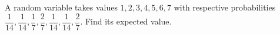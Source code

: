 A random variable takes values $1,2,3,4,5,6,7$ with respective probabilities $\dfrac{1}{14},\dfrac{1}{14},\dfrac{1}{7},\dfrac{2}{7},\dfrac{1}{14},\dfrac{1}{14},\dfrac{2}{7}$. Find its expected value.
